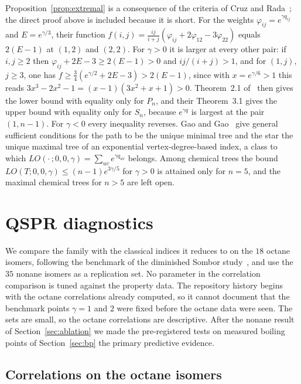 Proposition~\ref{prop:extremal} is a consequence of the criteria of Cruz and Rada~\cite{CruzRada2019PathStar}; the direct proof above is included because it is short. For the weights $\varphi_{ij} = e^{\gamma q_{ij}}$ and $E = e^{\gamma/3}$, their function $f(i,j) = \tfrac{ij}{i+j}(\varphi_{ij} + 2\varphi_{12} - 3\varphi_{22})$ equals $2(E - 1)$ at $(1,2)$ and $(2,2)$. For $\gamma > 0$ it is larger at every other pair: if $i, j \ge 2$ then $\varphi_{ij} + 2E - 3 \ge 2(E-1) > 0$ and $ij/(i+j) > 1$, and for $(1,j)$, $j \ge 3$, one has $f \ge \tfrac34(e^{\gamma/2} + 2E - 3) > 2(E-1)$, since with $x = e^{\gamma/6} > 1$ this reads $3x^3 - 2x^2 - 1 = (x-1)(3x^2 + x + 1) > 0$. Theorem~2.1 of~\cite{CruzRada2019PathStar} then gives the lower bound with equality only for $P_n$, and their Theorem~3.1 gives the upper bound with equality only for $S_n$, because $e^{\gamma q}$ is largest at the pair $(1,n-1)$. For $\gamma < 0$ every inequality reverses. Gao and Gao~\cite{GaoAMC2024} give general sufficient conditions for the path to be the unique minimal tree and the star the unique maximal tree of an exponential vertex-degree-based index, a class to which $LO(\cdot\,;0,0,\gamma) = \sum_{uv} e^{\gamma q_{uv}}$ belongs. Among chemical trees the bound
$LO(T;0,0,\gamma) \le (n-1)e^{3\gamma/5}$ for $\gamma > 0$ is attained only
for $n = 5$, and the maximal chemical trees for $n > 5$ are left open.

\section{QSPR diagnostics}\label{sec:sensitivity}

We compare the family with the classical indices it reduces to on the
$18$ octane isomers, following the benchmark of the diminished Sombor
study~\cite{MovahediGutmanRedzepovicFurtula2026}, and use the $35$ nonane
isomers as a replication set. No parameter in the correlation comparison
is tuned against the property data. The repository history begins with the octane correlations already
computed, so it cannot document that the benchmark points $\gamma = 1$ and
$2$ were fixed before the octane data were seen. The sets are small, so the octane
correlations are descriptive. After the nonane result of
Section~\ref{sec:ablation} we made the pre-registered tests on measured
boiling points of Section~\ref{sec:bp} the primary predictive evidence.

\subsection{Correlations on the octane isomers}\label{sec:octanes}

